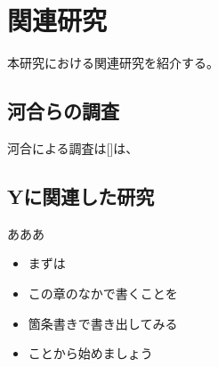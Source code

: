 \newpage
\section{関連研究} %
本研究における関連研究を紹介する。
\subsection{河合らの調査}
河合による調査は[]は、

\subsection{Yに関連した研究}
あああ
\begin{itemize}
\item まずは
\item この章のなかで書くことを
\item 箇条書きで書き出してみる
\item ことから始めましょう
\end{itemize}